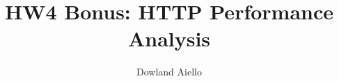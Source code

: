 \documentclass{article}
\begin{document}
\title{HW4 Bonus: HTTP Performance Analysis}
\author{Dowland Aiello}
\date{}

\maketitle
\fancyhf{}
\end{document}
